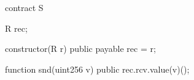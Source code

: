 \begin{soliditybox}[left=0pt,right=0pt,bottom=0pt]
contract S {
  R rec;

  constructor(R r) public payable {
    rec = r;
  }
    
  function snd(uint256 v) public {
    rec.rcv.value(v)();
  }
}
\end{soliditybox}